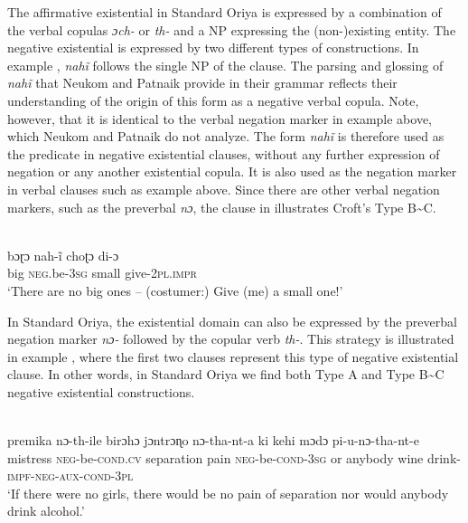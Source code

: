 ﻿\documentclass[output=paper]{langsci/langscibook}
\begin{document}
The affirmative existential in Standard Oriya is expressed by a
combination of the verbal copulas \textit{ɔch-} or \textit{th-} and a NP
expressing the (non-)existing entity. The negative existential is expressed
by two different types of constructions. In example
, \textit{nahĩ} follows the single NP of the
clause. The parsing and glossing of \textit{nahĩ} that Neukom and Patnaik
provide in their grammar reflects their understanding of the origin of this
form as a negative verbal copula.  Note, however, that it is identical to
the verbal negation marker in example  above,
which Neukom and Patnaik do not analyze.  The form \textit{nahĩ} is
therefore used as the predicate in negative existential clauses, without
any further expression of negation or any another existential copula. It is
also used as the negation marker in verbal clauses such as example
 above. Since there are other verbal negation
markers, such as the preverbal \textit{nɔ}, the clause in
 illustrates Croft's Type B{\textasciitilde}C. 
%
\begin{exe}\ex\label{ex:ieur-oriya-nobig}
\\
    \gll bɔɽɔ nah-ĩ choʈɔ di-ɔ \\
big   \textsc{neg}.be-\textsc{3sg}  small give-\textsc{2pl.impr} \\
    \glt `There are no big ones – (costumer:) Give (me) a small one!'
    \end{exe}

In Standard Oriya, the existential domain can also be expressed
by the preverbal negation marker \textit{nɔ-} followed by the copular verb
\textit{th-}. This strategy is illustrated in example
, where the first two clauses represent this type of negative existential clause. In other words, in Standard Oriya we find both Type A and Type B{\textasciitilde}C negative existential constructions. 
%
\begin{exe}\ex\label{ex:ieur-oriya-nogirls}
\\
    \gll premika nɔ-th-ile birɔhɔ jɔntrɔɳo nɔ-tha-nt-a ki kehi mɔdɔ
    pi-u-nɔ-tha-nt-e \\
mistress \textsc{neg}-be-\textsc{cond.cv} separation pain
\textsc{neg}-be-\textsc{cond-3sg} or anybody wine
drink-\textsc{impf-neg-aux-cond-3pl} \\
    \glt `If there were no girls, there would be no pain of separation nor
would anybody drink alcohol.'
    \end{exe} 
\end{document}
